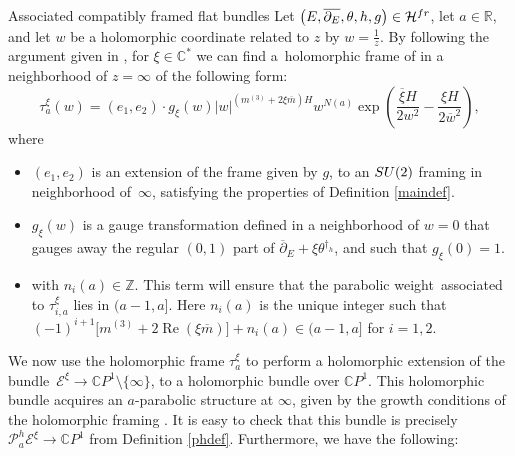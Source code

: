 \documentclass[11pt]{article}
\numberwithin{equation}{section}
\numberwithin{equation}{section}
\newcommand{\CP}{\mathbb{C}P^1}
\begin{document}
\begin{subsubsection}{Associated compatibly framed flat bundles}
Let $\bigl(E,\overline{\partial_E},\theta,h,g\bigr)\in \mathcal{H}^{{\rm fr}}$, let $a\in \mathbb{R}$, and let $w$ be a holomorphic coordinate related to $z$ by $w=\frac{1}{z}$. By following the argument given in \cite[Sections 7 and 8]{BB04}, for $\xi \in \mathbb{C}^*$ we can find a~holomorphic frame  of  in a neighborhood of $z=\infty$ of the following form:
\begin{equation}\label{twistcompframe}
 \tau_a^{\xi}(w)=(e_1,e_2)\cdot g_{\xi}(w) |w|^{(m^{(3)}+2\xi \overline{m})H}w^{N(a)}\exp \left(\frac{\overline{\xi}H}{2w^2}-\frac{\xi H}{2\overline{w}^2}\right),
\end{equation}
where
\begin{itemize}\itemsep=0pt
 \item $(e_1,e_2)$ is an extension of the frame given by $g$, to an ${\rm SU}(2)$ framing in neighborhood of~$\infty$, satisfying the properties of Definition \ref{maindef}.
 \item $g_{\xi}(w)$ is a gauge transformation defined in a neighborhood of $w=0$ that gauges away the regular $(0,1)$ part of $\overline{\partial}_E+\xi \theta^{\dagger_h}$, and such that $g_{\xi}(0)=1$.
 \item {} with $n_i(a)\in \mathbb{Z}$. This term will ensure that the parabolic weight~associated to $\tau_{i,a}^{\xi}$ lies in $ (a-1,a]$. Here $n_i(a)$ is the unique integer such that $(-1)^{i+1}\bigl[m^{(3)}+2\operatorname{Re}(\xi\overline{m})\bigr] + n_i(a)\in (a-1,a]$ for $i=1,2$.
\end{itemize}

We now use the holomorphic frame $\tau_a^{\xi}$ to perform a holomorphic extension of the bundle~${\mathcal{E}^{\xi}\to \CP \setminus \{\infty\}}$, to a holomorphic bundle over $\CP$. This holomorphic bundle acquires an $a$-parabolic structure at $\infty$, given by the growth conditions of the holomorphic framing . It is easy to check that this bundle is precisely $\mathcal{P}_a^h\mathcal{E}^{\xi}\to \CP$ from Definition \ref{phdef}. Furthermore, we have the following:


\end{subsubsection}
\end{document}
